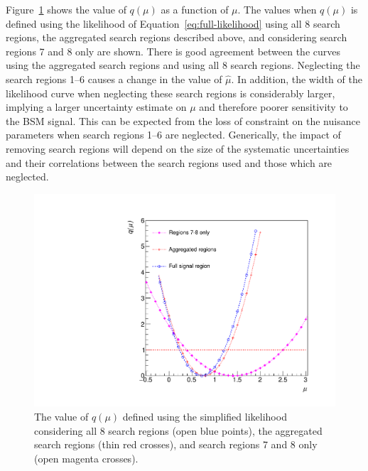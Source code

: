 Figure~\ref{fig:agg-likelihoodscan} shows the value of $q(\mu)$ as a function of $\mu$. The values when $q(\mu)$ 
is defined using the likelihood of Equation~\ref{eq:full-likelihood} using all 8 search regions, the aggregated search 
regions described above, and considering search regions 7 and 8 only are shown. There is good agreement between the curves using the 
aggregated search regions and using all 8 search regions. Neglecting the search regions 1--6 causes a change in the value
of $\hat{\mu}$. In addition, the width of the likelihood curve when neglecting these search regions is considerably
larger, implying a larger uncertainty estimate on $\mu$ and therefore poorer sensitivity to the BSM signal. 
This can be expected from the loss of constraint on the nuisance parameters when search regions 1--6 are neglected. 
Generically, the impact of removing search regions will depend on the size of the systematic uncertainties and their correlations 
between the search regions used and those which are neglected.

\begin{figure}[hbt]
  \begin{center} 
   \includegraphics[width=1.5\cmsFigWidth]{figures/r_agg.pdf}
   \caption{The value of $q(\mu)$ defined using the simplified likelihood considering all 8 search regions (open blue points), the aggregated search regions (thin red crosses),
   and search regions 7 and 8 only (open magenta crosses).}
   \label{fig:agg-likelihoodscan} 
  \end{center}
\end{figure}

